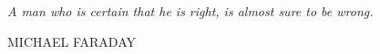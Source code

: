 \documentclass[14pt, svgnames, openany]{memoir}
\begin{document}

\clearpage
\thispagestyle{empty}
\null\vfill

\begin{center}
\parbox{\dimexpr\linewidth-2cm}{%
  \raggedright{\LARGE \itshape%
   A man who is certain that
   he is right, is almost
   sure to be wrong.\par\bigskip
  }  
\raggedleft\Large\MakeUppercase{Michael Faraday}\par%
}
\end{center}


\vfill\vfill

\clearpage


\tableofcontents



\end{document}

